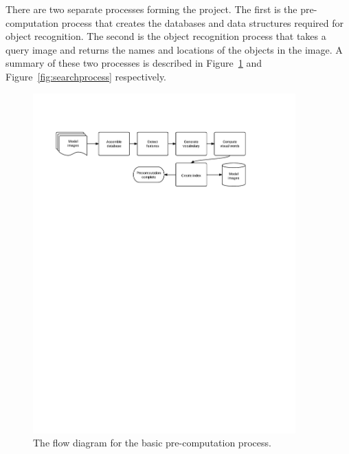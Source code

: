 \documentclass[11pt, onecolumn, a4paper, final]{report} %
\begin{document}
There are two separate processes forming the project. The first is the pre-computation process that creates the databases and data structures required for object recognition. The second is the object recognition process that takes a query image and returns the names and locations of the objects in the image. A summary of these two processes is described in Figure~\ref{fig:precompprocess} and Figure~\ref{fig:searchprocess} respectively.

\begin{figure}[htb]
\centering 
\includegraphics[width=0.9\textwidth]{images/PrecomputeProcess.pdf}
\caption{The flow diagram for the basic pre-computation process.}
\label{fig:precompprocess}
\end{figure}
\end{document}
